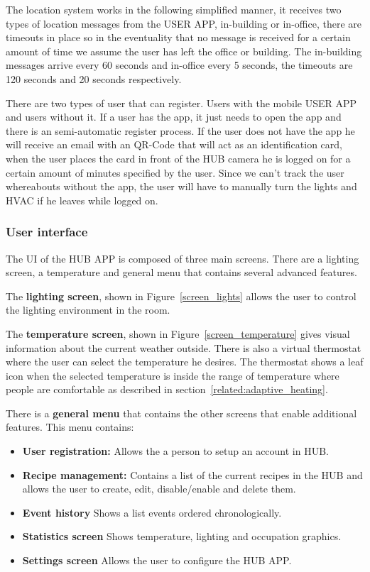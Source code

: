 The location system works in the following simplified manner, it receives two types of location messages from the USER APP, in-building or in-office, there are timeouts in place so in the eventuality that no message is received for a certain amount of time we assume the user has left the office or building. The in-building messages arrive every 60 seconds and in-office every 5 seconds, the timeouts are 120 seconds and 20 seconds respectively.


There are two types of user that can register. Users with the mobile USER APP and users without it. If a user has the app, it just needs to open the app and there is an semi-automatic register process. If the user does not have the app he will receive an email with an QR-Code that will act as an identification card, when the user places the card in front of the HUB camera he is logged on for a certain amount of minutes specified by the user. Since we can't track the user whereabouts without the app, the user will have to manually turn the lights and \ac{HVAC} if he leaves while logged on.



\subsubsection{User interface}


The \ac{UI} of the HUB APP is composed of three main screens. There are a lighting screen, a temperature and general menu that contains several advanced features.

The \textbf{lighting screen}, shown in Figure~\ref{screen_lights} allows the user to control the lighting environment in the room.

The \textbf{temperature screen}, shown in Figure~\ref{screen_temperature} gives visual information about the current weather outside. There is also a virtual thermostat where the user can select the temperature he desires. The thermostat shows a leaf icon when the selected temperature is inside the range of temperature where people are comfortable as described in section~\ref{related:adaptive_heating}. 

There is a \textbf{general menu} that contains the other screens that enable additional features. This menu contains:
\begin{itemize}
  \item \textbf{User registration:} Allows the a person to setup an account in HUB. 
  \item \textbf{Recipe management:} Contains a list of the current recipes in the HUB and allows the user to create, edit, disable/enable and delete them.
  
  \item \textbf{Event history} Shows a list events ordered chronologically. 
  
  \item \textbf{Statistics screen} Shows temperature, lighting and occupation graphics. 
  
  \item \textbf{Settings screen} Allows the user to configure the HUB APP.
\end{itemize}



